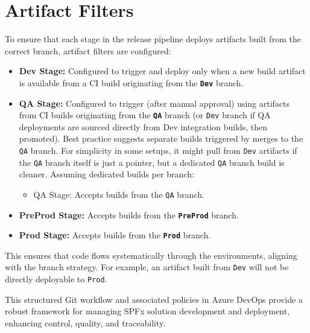 \section{Artifact Filters}
\label{sec:ArtifactFilters}

To ensure that each stage in the release pipeline deploys artifacts built from the correct branch, artifact filters are configured:

\begin{itemize}
    \item \textbf{Dev Stage:} Configured to trigger and deploy only when a new build artifact is available from a CI build originating from the \textbf{\texttt{Dev}} branch.
    \item \textbf{QA Stage:} Configured to trigger (after manual approval) using artifacts from CI builds originating from the \textbf{\texttt{QA}} branch (or \texttt{Dev} branch if QA deployments are sourced directly from Dev integration builds, then promoted). Best practice suggests separate builds triggered by merges to the \texttt{QA} branch. For simplicity in some setups, it might pull from \texttt{Dev} artifacts if the \texttt{QA} branch itself is just a pointer, but a dedicated \texttt{QA} branch build is cleaner. Assuming dedicated builds per branch:
    \begin{itemize}
        \item QA Stage: Accepts builds from the \texttt{QA} branch.
    \end{itemize}
    \item \textbf{PreProd Stage:} Accepts builds from the \textbf{\texttt{PreProd}} branch.
    \item \textbf{Prod Stage:} Accepts builds from the \textbf{\texttt{Prod}} branch.
\end{itemize}
This ensures that code flows systematically through the environments, aligning with the branch strategy. For example, an artifact built from \texttt{Dev} will not be directly deployable to \texttt{Prod}.

This structured Git workflow and associated policies in Azure DevOps provide a robust framework for managing SPFx solution development and deployment, enhancing control, quality, and traceability.